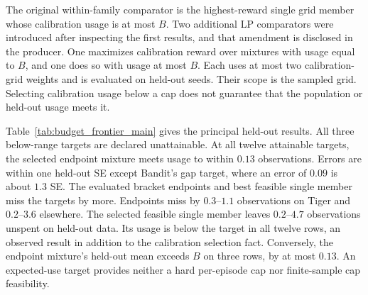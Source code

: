\documentclass[manuscript, screen, review]{jair}
\begin{document}
The original within-family comparator is the highest-reward single grid member whose calibration usage is at most $B$. Two additional LP comparators were introduced after inspecting the first results, and that amendment is disclosed in the producer. One maximizes calibration reward over mixtures with usage equal to $B$, and one does so with usage at most $B$. Each uses at most two calibration-grid weights and is evaluated on held-out seeds. Their scope is the sampled grid. Selecting calibration usage below a cap does not guarantee that the population or held-out usage meets it.

Table~\ref{tab:budget_frontier_main} gives the principal held-out results. All three below-range targets are declared unattainable. At all twelve attainable targets, the selected endpoint mixture meets usage to within $0.13$ observations. Errors are within one held-out SE except Bandit's gap target, where an error of $0.09$ is about $1.3$ SE. The evaluated bracket endpoints and best feasible single member miss the targets by more. Endpoints miss by $0.3$--$1.1$ observations on Tiger and $0.2$--$3.6$ elsewhere. The selected feasible single member leaves $0.2$--$4.7$ observations unspent on held-out data. Its usage is below the target in all twelve rows, an observed result in addition to the calibration selection fact. Conversely, the endpoint mixture's held-out mean exceeds $B$ on three rows, by at most $0.13$. An expected-use target provides neither a hard per-episode cap nor finite-sample cap feasibility.
\end{document}
